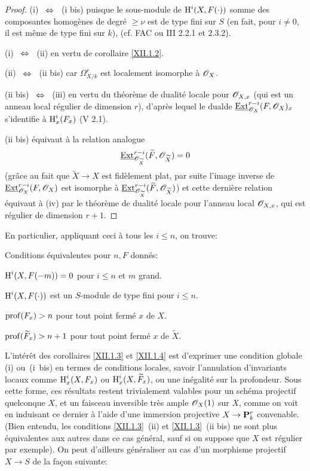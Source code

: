 \begin{proof}
(i) ~$\Ssi$~ (i bis) puisque le sous-module de $\operatorname{H}^i(X, F(\cdot))$ somme des composantes homog\`enes de degr\'e $\geq \nu$ est de type fini sur $S$ (en fait, pour $i\neq 0$, il est m\^eme de type fini sur $k$), (cf. FAC ou \EGA III 2.2.1 et 2.3.2).

(i) ~$\Ssi$~ (ii) en vertu de corollaire \ref{XII.1.2}.

(ii) ~$\Ssi$~ (ii bis) car $\Omega_{X/k}^r$ est localement isomorphe \`a $\mathscr{O}_X$.

(ii bis) ~$\Ssi$~ (iii) en vertu du th\'eor\`eme de dualit\'e locale pour $\mathscr{O}_{X, x}$ (qui est un anneau local r\'egulier de dimension $r$), d'apr\`es lequel le \og dual\fg de $\mathop{\underline{\mathrm{Ext}}}\nolimits^{r-i}_{\mathscr{O}_X}(F, \mathscr{O}_X)_x$ s'identifie \`a $\operatorname{H}^i_x(F_x)$ (V 2.1).

(ii bis) \'equivaut \`a la relation analogue
\[
\mathop{\underline{\mathrm{Ext}}}\nolimits^{r-i}_{{\mathscr O}_{\widetilde{X}}}(\widetilde{F}, {\mathscr O}_{\widetilde{X}})=0
\]
(gr\^ace au fait que $\widetilde{X}\to X$ est fid\`element plat, par suite l'image inverse de $\mathop{\underline{\mathrm{Ext}}}\nolimits^{r-i}_{\mathscr{O}_X}(F, \mathscr{O}_X)$ est isomorphe \`a $\mathop{\underline{\mathrm{Ext}}}\nolimits^{r-i}_{{\mathscr O}_{\widetilde{X}}}(\widetilde{F}, {\mathscr O}_{\widetilde{X}})$) et cette derni\`ere relation \'equivaut \`a (iv) par le th\'eor\`eme de dualit\'e locale pour l'anneau local $\mathscr{O}_{X, x}$, qui est r\'egulier de dimension $r+1$.
\skipqed
\end{proof}

En particulier, appliquant ceci \`a tous les $i\leq n$, on trouve:

\begin{corollaire} \label{XII.1.4}
Conditions \'equivalentes pour $n, F$ donn\'es:
\begin{enumeratei}
\item
$\operatorname{H}^i(X, F(-m))=0$ pour $i\leq n$ et $m$ grand.
\item[\textup{(i bis)}] $\operatorname{H}^i(X, F(\cdot))$ est un $S$-module de type fini pour $i\leq n$.
\item
$\operatorname{prof}(F_x)>n$ pour tout point ferm\'e $x$ de $X$.
\item
$\operatorname{prof}(\widetilde{F}_x)>n+1$ pour tout point ferm\'e $x$ de $\widetilde{X}$.
\end{enumeratei}
\end{corollaire}

L'int\'er\^et des corollaires \ref{XII.1.3} et \ref{XII.1.4} est d'exprimer une condition globale (i) ou~(i~bis) en termes de conditions locales, \ignorespaces savoir l'annulation d'invariants locaux comme $\operatorname{H}_x^i(X, F_x)$ ou $\operatorname{H}_x^i(X, \widetilde{F}_x)$, ou une in\'egalit\'e sur la profondeur. Sous cette forme, ces r\'esultats restent trivialement valables pour un sch\'ema projectif quelconque $X$, et un faisceau inversible tr\`es ample $\mathscr{O}_X(1)$ sur $X$, comme on voit en induisant ce dernier \`a l'aide d'une immersion projective $X\to\PP_k^r$ convenable. (Bien entendu, les conditions \ref{XII.1.3}~(ii) et \ref{XII.1.3}~(ii bis) ne sont plus \'equivalentes aux autres dans ce cas g\'en\'eral, sauf si on suppose que $X$ est r\'egulier par exemple). On peut d'ailleurs g\'en\'eraliser au cas d'un morphisme projectif $X\to S$ de la fa\c con suivante:

